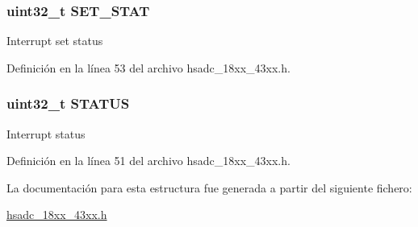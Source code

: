 \subsubsection[{\texorpdfstring{S\+E\+T\+\_\+\+S\+T\+AT}{SET_STAT}}]{ uint32\+\_\+t S\+E\+T\+\_\+\+S\+T\+AT}\hypertarget{struct_h_s_a_d_c_i_n_t_c_t_r_l___t_aa392d0314798880efcc1243457aad369}{}\label{struct_h_s_a_d_c_i_n_t_c_t_r_l___t_aa392d0314798880efcc1243457aad369}
Interrupt set status 

Definición en la línea 53 del archivo hsadc\+\_\+18xx\+\_\+43xx.\+h.

\subsubsection[{\texorpdfstring{S\+T\+A\+T\+US}{STATUS}}]{ uint32\+\_\+t S\+T\+A\+T\+US}\hypertarget{struct_h_s_a_d_c_i_n_t_c_t_r_l___t_aece2c880dc5ba01a2fc9326dc080dc26}{}\label{struct_h_s_a_d_c_i_n_t_c_t_r_l___t_aece2c880dc5ba01a2fc9326dc080dc26}
Interrupt status 

Definición en la línea 51 del archivo hsadc\+\_\+18xx\+\_\+43xx.\+h.



La documentación para esta estructura fue generada a partir del siguiente fichero\+:\begin{DoxyCompactItemize}
\item 
\hyperlink{hsadc__18xx__43xx_8h}{hsadc\+\_\+18xx\+\_\+43xx.\+h}\end{DoxyCompactItemize}

